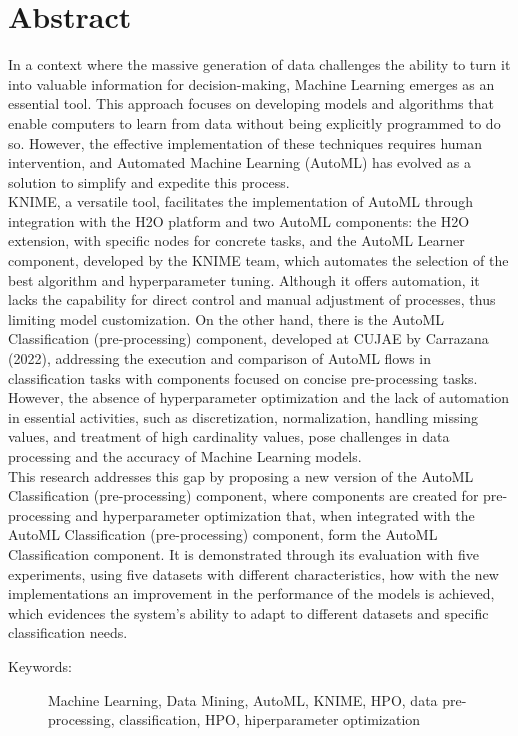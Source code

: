 \section*{Abstract}
In a context where the massive generation of data challenges the ability to turn it into valuable information for decision-making, Machine Learning emerges as an essential tool. This approach focuses on developing models and algorithms that enable computers to learn from data without being explicitly programmed to do so. However, the effective implementation of these techniques requires human intervention, and Automated Machine Learning (AutoML) has evolved as a solution to simplify and expedite this process.\\
KNIME, a versatile tool, facilitates the implementation of AutoML through integration with the H2O platform and two AutoML components: the H2O extension, with specific nodes for concrete tasks, and the AutoML Learner component, developed by the KNIME team, which automates the selection of the best algorithm and hyperparameter tuning. Although it offers automation, it lacks the capability for direct control and manual adjustment of processes, thus limiting model customization. On the other hand, there is the AutoML Classification (pre-processing) component, developed at CUJAE by Carrazana (2022), addressing the execution and comparison of AutoML flows in classification tasks with components focused on concise pre-processing tasks. However, the absence of hyperparameter optimization and the lack of automation in essential activities, such as discretization, normalization, handling missing values, and treatment of high cardinality values, pose challenges in data processing and the accuracy of Machine Learning models. \\
This research addresses this gap by proposing a new version of the AutoML Classification (pre-processing) component, where components are created for pre-processing and hyperparameter optimization that, when integrated with the AutoML Classification (pre-processing) component, form the AutoML Classification component. It is demonstrated through its evaluation with five experiments, using five datasets with different characteristics, how with the new implementations an improvement in the performance of the models is achieved, which evidences the system's ability to adapt to different datasets and specific classification needs.

\begin{description}
	\item[Keywords:]{Machine Learning, Data Mining, AutoML, KNIME, HPO, data pre-processing, classification, HPO, hiperparameter optimization}
\end{description}

